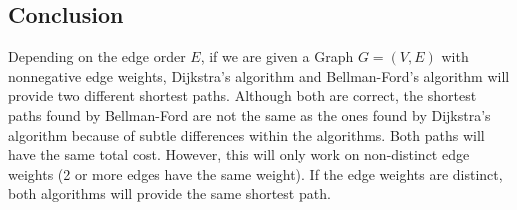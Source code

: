 \documentclass{article}
\theoremstyle{definition}
\theoremstyle{remark}
\theoremstyle{plain}
\begin{document}
\subsection*{Conclusion}
Depending on the edge order $E$, if we are given a Graph $G = (V,E)$ with nonnegative edge weights, Dijkstra's algorithm and Bellman-Ford's algorithm will provide two different shortest paths. Although both are correct, the shortest paths found by Bellman-Ford are not the same as the ones found by Dijkstra's algorithm because of subtle differences within the algorithms. Both paths will have the same total cost. However, this will only work on non-distinct edge weights (2 or more edges have the same weight). If the edge weights are distinct, both algorithms will provide the same shortest path. 
\end{document}
